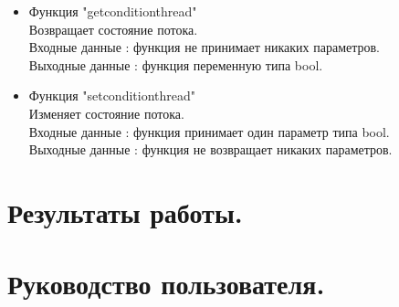 \documentclass[a4document]{article}
\begin{document}
{\begin{itemize}
\begin{itemize}
                Закрывает Serial Port и останавливает передачу данных. \\
                Входные данные : функция принмает объект класса str. \\ 
                Выходные данные : функция не возвращает никаких параметров.
            \item Функция "getconditionthread" \\
                Возвращает состояние потока. \\
                Входные данные : функция не принимает никаких параметров. \\ 
                Выходные данные : функция переменную типа bool.
            \item Функция "setconditionthread" \\
                Изменяет состояние потока. \\
                Входные данные : функция принимает один параметр типа bool. \\ 
                Выходные данные : функция не возвращает никаких параметров.
        \end{itemize}
        
       
        
        
        
        
        
        
        
        
        
        
        
        
         
        
        
    
        
\end{itemize}
}

{
\newpage

\section*{Результаты работы.} 
}

{
\newpage

\section*{Руководство пользователя.} 
}
\end{document}
